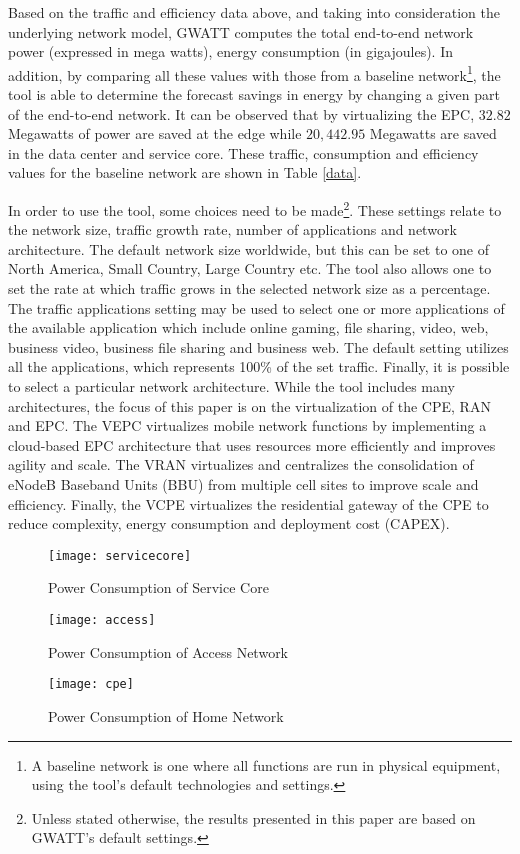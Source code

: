 \documentclass[conference]{IEEEtran}
\begin{document}
Based on the traffic and efficiency data above, and taking into consideration the underlying network model, GWATT computes the total end-to-end network power (expressed in mega watts), energy consumption (in gigajoules). In addition, by comparing all these values with those from a baseline network\footnote{A baseline network is one where all functions are run in physical equipment, using the tool's default technologies and settings.}, the tool is able to determine the forecast savings in energy by changing a given part of the end-to-end network. It can be observed that by virtualizing the EPC, $32.82$ Megawatts of power are saved at the edge while $20,442.95$ Megawatts are saved in the data center and service core. These traffic, consumption and efficiency values for the baseline network are shown in Table \ref{data}.

In order to use the tool, some choices need to be made\footnote{Unless stated otherwise, the results presented in this paper are based on GWATT's default settings.}. These settings relate to the network size, traffic growth rate, number of applications and network architecture. The default network size worldwide, but this can be set to one of North America, Small Country, Large Country etc. The tool also allows one to set the rate at which traffic grows in the selected network size as a percentage. The traffic applications setting may be used to select one or more applications of the available application which include online gaming, file sharing, video, web, business video, business file sharing and business web. The default setting utilizes all the applications, which represents 100\% of the set traffic. Finally, it is possible to select a particular network architecture. While the tool includes many architectures, the focus of this paper is on the virtualization of the CPE, RAN and EPC. The VEPC virtualizes mobile network functions by implementing a cloud-based EPC architecture that uses resources more efficiently and improves agility and scale. The VRAN virtualizes and centralizes the consolidation of eNodeB Baseband Units (BBU) from multiple cell sites to improve scale and efficiency. Finally, the VCPE virtualizes the residential gateway of the CPE to reduce complexity, energy consumption and deployment cost (CAPEX).

 \begin{figure*}[t]
\begin{minipage}{.33\textwidth}
\centering
\resizebox{.95\textwidth}{!}
{\texttt{[image: servicecore]}}
  \caption{Power Consumption of Service Core}
  \label{servicecore}
\end{minipage}
\begin{minipage}{.33\textwidth}
\centering
\resizebox{.95\textwidth}{!}
{\texttt{[image: access]}}
  \caption{Power Consumption of Access Network}
  \label{access}
\end{minipage}
\begin{minipage}{.33\textwidth}
\centering
\resizebox{.95\textwidth}{!}
{\texttt{[image: cpe]}}
  \caption{Power Consumption of Home Network}
  \label{cpe}
\end{minipage}
\end{figure*}
\end{document}
